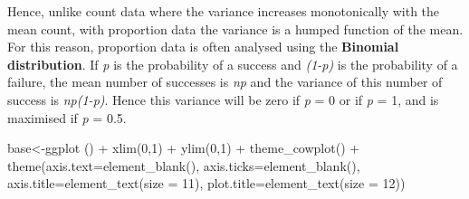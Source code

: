 \documentclass[
  letterpaper,
  DIV=11,
  numbers=noendperiod]{scrreprt}
\newenvironment{Shaded}{\begin{snugshade}}{\end{snugshade}}
\newcommand{\AttributeTok}[1]{\textcolor[rgb]{0.40,0.45,0.13}{#1}}
\newcommand{\DecValTok}[1]{\textcolor[rgb]{0.68,0.00,0.00}{#1}}
\newcommand{\FunctionTok}[1]{\textcolor[rgb]{0.28,0.35,0.67}{#1}}
\newcommand{\NormalTok}[1]{\textcolor[rgb]{0.00,0.23,0.31}{#1}}
\newcommand{\OtherTok}[1]{\textcolor[rgb]{0.00,0.23,0.31}{#1}}
\newcommand{\SpecialCharTok}[1]{\textcolor[rgb]{0.37,0.37,0.37}{#1}}
\begin{document}
Hence, unlike count data where the variance increases monotonically with
the mean count, with proportion data the variance is a humped function
of the mean. For this reason, proportion data is often analysed using
the \textbf{Binomial distribution}. If \emph{p} is the probability of a
success and \emph{(1-p)} is the probability of a failure, the mean
number of successes is \emph{np} and the variance of this number of
success is \emph{np(1-p)}. Hence this variance will be zero if \emph{p}
= 0 or if \emph{p} = 1, and is maximised if \emph{p} = 0.5.

\begin{Shaded}
\begin{Highlighting}[]
\NormalTok{base}\OtherTok{\textless{}{-}}\FunctionTok{ggplot}\NormalTok{ () }\SpecialCharTok{+}
  \FunctionTok{xlim}\NormalTok{(}\DecValTok{0}\NormalTok{,}\DecValTok{1}\NormalTok{) }\SpecialCharTok{+}
  \FunctionTok{ylim}\NormalTok{(}\DecValTok{0}\NormalTok{,}\DecValTok{1}\NormalTok{) }\SpecialCharTok{+}
  \FunctionTok{theme\_cowplot}\NormalTok{() }\SpecialCharTok{+}
  \FunctionTok{theme}\NormalTok{(}\AttributeTok{axis.text=}\FunctionTok{element\_blank}\NormalTok{(),}
        \AttributeTok{axis.ticks=}\FunctionTok{element\_blank}\NormalTok{(),}
        \AttributeTok{axis.title=}\FunctionTok{element\_text}\NormalTok{(}\AttributeTok{size =} \DecValTok{11}\NormalTok{),}
        \AttributeTok{plot.title=}\FunctionTok{element\_text}\NormalTok{(}\AttributeTok{size =} \DecValTok{12}\NormalTok{))}


\end{Highlighting}
\end{Shaded}
\end{document}
